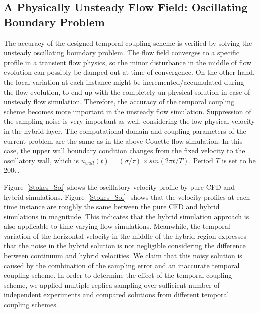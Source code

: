 \documentclass[preprint,12pt]{elsarticle}
\begin{document}
\subsection{A Physically Unsteady Flow Field: Oscillating Boundary Problem}
\label{sec:accuracy_oscillation}

The accuracy of the designed temporal coupling scheme is verified by solving the unsteady oscillating boundary problem. The flow field converges to a specific profile in a transient flow physics, so the minor disturbance in the middle of flow evolution can possibly be damped out at time of convergence. On the other hand, the local variation at each instance might be incremented/accumulated during the flow evolution, to end up with the completely un-physical solution in case of unsteady flow simulation. Therefore, the accuracy of the temporal coupling scheme becomes more important in the unsteady flow simulation. Suppression of the sampling noise is very important as well, considering the low physical velocity in the hybrid layer. The computational domain and coupling parameters of the current problem are the same as in the above Couette flow simulation. In this case, the upper wall boundary condition changes from the fixed velocity to the oscillatory wall, which is $u_{wall}(t)=({\sigma}/{\tau}){\times}sin(2{\pi}t/T)$. Period $T$ is set to be 200$\tau$.

Figure~\ref{Stokes_Sol} shows the oscillatory velocity profile by pure CFD and hybrid simulations. Figure~\ref{Stokes_Sol}- shows that the velocity profiles at each time instance are roughly the same between the pure CFD and hybrid simulations in magnitude. This indicates that the hybrid simulation approach is also applicable to time-varying flow simulations. Meanwhile, the temporal variation of the horizontal velocity in the middle of the hybrid region expresses that the noise in the hybrid solution is not negligible considering the difference between continuum and hybrid velocities. We claim that this noisy solution is caused by the combination of the sampling error and an inaccurate temporal coupling scheme. In order to determine the effect of the temporal coupling scheme, we applied multiple replica sampling over sufficient number of independent experiments and compared solutions from different temporal coupling schemes.
\end{document}
